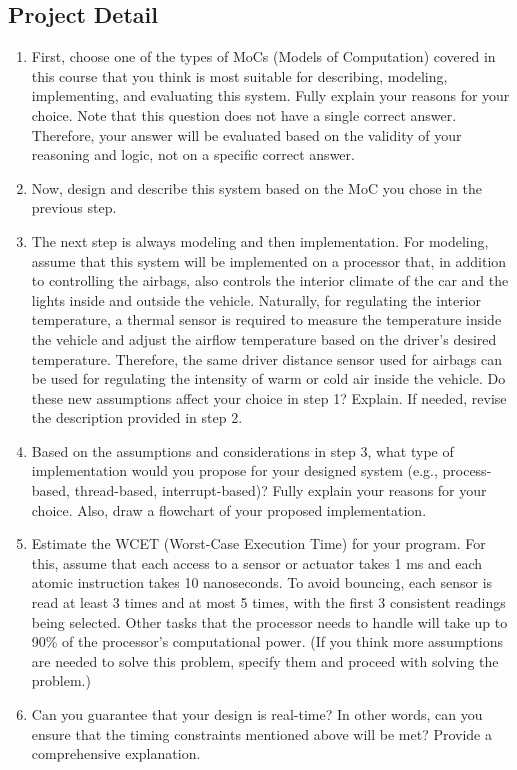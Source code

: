 \documentclass[12pt	]{article}
\begin{document}
\subsection{Project Detail}
\begin{enumerate}
	\item
	First, choose one of the types of MoCs (Models of Computation) covered in this course that you think is most suitable for describing, modeling, implementing, and evaluating this system. Fully explain your reasons for your choice. Note that this question does not have a single correct answer. Therefore, your answer will be evaluated based on the validity of your reasoning and logic, not on a specific correct answer. 
	
	\item 
	Now, design and describe this system based on the MoC you chose in the previous step. 
	
	\item 
	The next step is always modeling and then implementation. For modeling, assume that this system will be implemented on a processor that, in addition to controlling the airbags, also controls the interior climate of the car and the lights inside and outside the vehicle. Naturally, for regulating the interior temperature, a thermal sensor is required to measure the temperature inside the vehicle and adjust the airflow temperature based on the driver's desired temperature. Therefore, the same driver distance sensor used for airbags can be used for regulating the intensity of warm or cold air inside the vehicle. Do these new assumptions affect your choice in step 1? Explain. If needed, revise the description provided in step 2.
	
	\item 
	Based on the assumptions and considerations in step 3, what type of implementation would you propose for your designed system (e.g., process-based, thread-based, interrupt-based)? Fully explain your reasons for your choice. Also, draw a flowchart of your proposed implementation. 
	
	\item 
	Estimate the WCET (Worst-Case Execution Time) for your program. For this, assume that each access to a sensor or actuator takes 1 ms and each atomic instruction takes 10 nanoseconds. To avoid bouncing, each sensor is read at least 3 times and at most 5 times, with the first 3 consistent readings being selected. Other tasks that the processor needs to handle will take up to 90\% of the processor's computational power. (If you think more assumptions are needed to solve this problem, specify them and proceed with solving the problem.)
	
	\item 
	Can you guarantee that your design is real-time? In other words, can you ensure that the timing constraints mentioned above will be met? Provide a comprehensive explanation. 
\end{enumerate}
\end{document}
